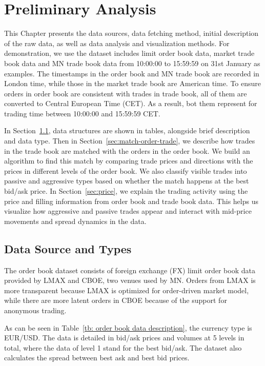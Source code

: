 \chapter{Preliminary Analysis} \label{chapter:preliminary}
This Chapter presents the data sources, data fetching method, initial description of the raw data, as well as data analysis and visualization methods. For demonstration, we use the dataset includes limit order book data, market trade book data and MN trade book data from 10:00:00 to 15:59:59 on 31st January as examples. The timestamps in the order book and MN trade book are recorded in London time, while those in the market trade book are American time. To ensure orders in order book are consistent with trades in trade book, all of them are converted to Central European Time (CET). As a result, bot them represent for trading time between 10:00:00 and 15:59:59 CET. 

In Section~\ref{sec:data-source}, data structures are shown in tables, alongside brief description and data type. Then in Section~\ref{sec:match-order-trade}, we describe how trades in the trade book are matched with the orders in the order book. We build an algorithm to find this match by comparing trade prices and directions with the prices in different levels of the order book. We also classify visible trades into passive and aggressive types based on whether the match happens at the best bid/ask price. 
In Section~\ref{sec:price}, we explain the trading activity using the price and filling information from order book and trade book data. This helps us visualize how aggressive and passive trades appear and interact with mid-price movements and spread dynamics in the data. 


\section{Data Source and Types} \label{sec:data-source}
The order book dataset consists of foreign exchange (FX) limit order book data provided by LMAX and CBOE, two venues used by MN. Orders from LMAX is more transparent because LMAX is optimized for order-driven market model, while there are more latent orders in CBOE because of the support for anonymous trading. 

As can be seen in Table~\ref{tb: order book data description}, the currency type is EUR/USD. The data is detailed in bid/ask prices and volumes at 5 levels in total, where the data of level 1 stand for the best bid/ask. The dataset also calculates the spread between best ask and best bid prices.

